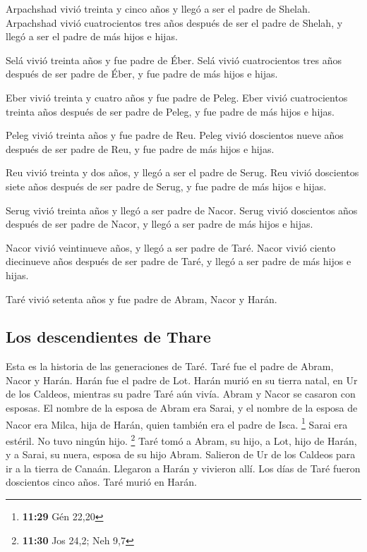 \begin{paracol}{2}
 Arpachshad vivió treinta y cinco años y llegó a ser el
padre de Shelah.  Arpachshad vivió cuatrocientos tres
años después de ser el padre de Shelah, y llegó a ser el padre de más
hijos e hijas.

 Selá vivió treinta años y fue padre de Éber.
 Selá vivió cuatrocientos tres años después de ser padre
de Éber, y fue padre de más hijos e hijas.

 Eber vivió treinta y cuatro años y fue padre de Peleg.
 Eber vivió cuatrocientos treinta años después de ser
padre de Peleg, y fue padre de más hijos e hijas.

 Peleg vivió treinta años y fue padre de Reu.
 Peleg vivió doscientos nueve años después de ser padre
de Reu, y fue padre de más hijos e hijas.

 Reu vivió treinta y dos años, y llegó a ser el padre de
Serug.  Reu vivió doscientos siete años después de ser
padre de Serug, y fue padre de más hijos e hijas.

 Serug vivió treinta años y llegó a ser padre de Nacor.
 Serug vivió doscientos años después de ser padre de
Nacor, y llegó a ser padre de más hijos e hijas.

 Nacor vivió veintinueve años, y llegó a ser padre de
Taré.  Nacor vivió ciento diecinueve años después de ser
padre de Taré, y llegó a ser padre de más hijos e hijas.

 Taré vivió setenta años y fue padre de Abram, Nacor y
Harán.

\hypertarget{los-descendientes-de-thare}{%
\subsection{Los descendientes de
Thare}\label{los-descendientes-de-thare}}

 Esta es la historia de las generaciones de Taré. Taré
fue el padre de Abram, Nacor y Harán. Harán fue el padre de Lot.
 Harán murió en su tierra natal, en Ur de los Caldeos,
mientras su padre Taré aún vivía.  Abram y Nacor se
casaron con esposas. El nombre de la esposa de Abram era Sarai, y el
nombre de la esposa de Nacor era Milca, hija de Harán, quien también era
el padre de Isca. \footnote{\textbf{11:29} Gén 22,20} 
Sarai era estéril. No tuvo ningún hijo. \footnote{\textbf{11:30} Jos
  24,2; Neh 9,7}  Taré tomó a Abram, su hijo, a Lot, hijo
de Harán, y a Sarai, su nuera, esposa de su hijo Abram. Salieron de Ur
de los Caldeos para ir a la tierra de Canaán. Llegaron a Harán y
vivieron allí.  Los días de Taré fueron doscientos cinco
años. Taré murió en Harán.


\end{paracol}
